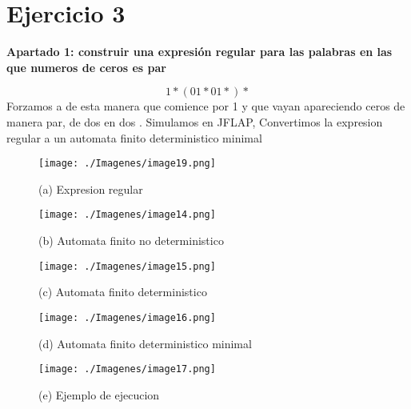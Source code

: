 \documentclass{article}
\begin{document}
        \section{Ejercicio 3}
        \textbf{Apartado 1: construir una expresión regular para las palabras en las que numeros de ceros es par}
        
        \vspace{\baselineskip} %

        $$ 1*(01*01*)*$$
        Forzamos a de esta manera que comience por 1 y que vayan apareciendo ceros de manera par, de dos en dos
        . Simulamos en JFLAP, Convertimos la expresion regular a un automata finito deterministico minimal
        
        \begin{figure}[!h]
            \centering
            \texttt{[image: ./Imagenes/image19.png]}
            \label{fig:label4}
            \caption*{(a) Expresion regular}
        \end{figure}

        \begin{figure}[!h]
            \centering
            \texttt{[image: ./Imagenes/image14.png]}
            \label{fig:label4}
            \caption*{(b) Automata finito no deterministico}
        \end{figure}

        \newpage

        \begin{figure}[!h]
            \centering
            \texttt{[image: ./Imagenes/image15.png]}
            \label{fig:label4}
            \caption*{(c) Automata finito  deterministico}
        \end{figure}

        \begin{figure}[!h]
            \centering
            \texttt{[image: ./Imagenes/image16.png]}
            \label{fig:label4}
            \caption*{(d) Automata finito deterministico minimal}
        \end{figure}

        \newpage
        \begin{figure}[!h]
            \centering
            \texttt{[image: ./Imagenes/image17.png]}
            \label{fig:label4}
            \caption*{(e) Ejemplo de ejecucion}
        \end{figure}
\end{document}
